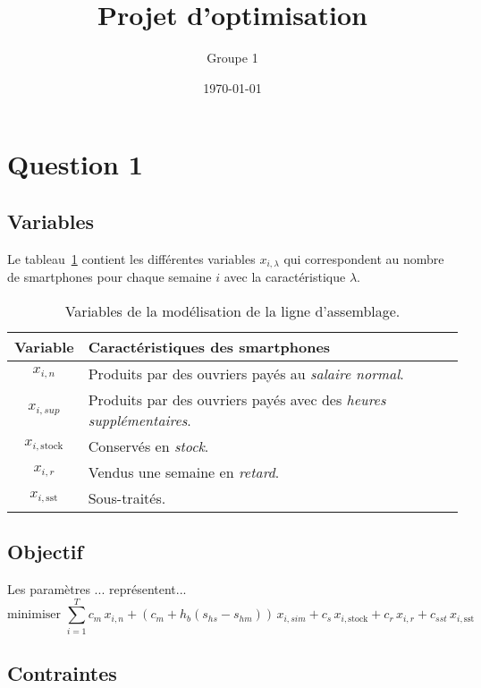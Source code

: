 \documentclass[12pt,oneside,a4paper]{article}
\title{Projet d'optimisation}
\author{Groupe 1}
\date{\today}
\begin{document}
\maketitle

\section{Question 1}

\subsection*{Variables}
Le tableau~\ref{tab:variablesQuestion1} contient les différentes variables $x_{i,\lambda}$
qui correspondent au nombre de smartphones pour chaque semaine $i$
avec la caractéristique $\lambda$.
 
\begin{table}
  \begin{center}
  \begin{tabular}{|c|l|}
    \hline
    Variable & Caractéristiques des smartphones \\
    \hline
    \hline
    $x_{i,n}$ & Produits par des ouvriers payés au \emph{salaire normal}. \\
    \hline
    $x_{i,sup}$ & Produits par des ouvriers payés avec des \emph{heures supplémentaires}. \\
    \hline
    $x_{i,\text{stock}}$ & Conservés en \emph{stock}. \\
    \hline
    $x_{i,r}$ & Vendus une semaine en \emph{retard}. \\
    \hline
    $x_{i,\text{sst}}$ & Sous-traités. \\
    \hline
  \end{tabular}
  \caption{Variables de la modélisation de la ligne d'assemblage.}
  \label{tab:variablesQuestion1}
  \end{center}
\end{table}

\subsection*{Objectif}
Les paramètres ... représentent...
\[
  \mbox{minimiser } 
  \sum_{i=1}^{T} c_m\, x_{i,n} + (c_m + h_b (s_{hs} - s_{hm}))\, x_{i,sim}
  + c_s\, x_{i,\text{stock}} + c_r\, x_{i,r} + c_{sst}\, x_{i,\text{sst}}
\]

\subsection*{Contraintes}
\end{document}
